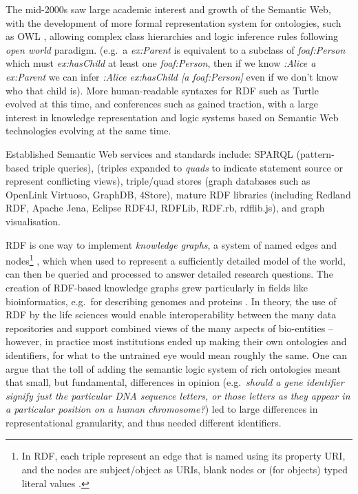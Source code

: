 The mid-2000s saw large academic interest and growth of the Semantic Web, with the development of more formal representation system for ontologies, such as OWL \cite{W3C 2012}, allowing complex class hierarchies and logic inference rules following \emph{open world} paradigm. (e.g.~a \emph{ex:Parent} is equivalent to a subclass of \emph{foaf:Person} which must \emph{ex:hasChild} at least one \emph{foaf:Person}, then if we know \emph{:Alice a ex:Parent} we can infer \emph{:Alice ex:hasChild {[}a foaf:Person{]}} even if we don't know who that child is). More human-readable syntaxes for RDF such as Turtle evolved at this time, and conferences such as  \cite{Horrocks 2022} gained traction, with a large interest in knowledge representation and logic systems based on Semantic Web technologies evolving at the same time.

Established Semantic Web services and standards include: SPARQL \cite{W3C 2013} (pattern-based triple queries),  \cite{Wood 2014} (triples expanded to \emph{quads} to indicate statement source or represent conflicting views), triple/quad stores (graph databases such as OpenLink Virtuoso, GraphDB, 4Store), mature RDF libraries (including Redland RDF, Apache Jena, Eclipse RDF4J, RDFLib, RDF.rb, rdflib.js), and graph visualisation.

RDF is one way to implement \emph{knowledge graphs}, a system of named edges and nodes\footnote{In RDF, each triple represent an edge that is named using its property URI, and the nodes are subject/object as URIs, blank nodes or (for objects) typed literal values \cite{Schreiber 2014}.} \cite{Nurdiati 2008}, which when used to represent a sufficiently detailed model of the world, can then be queried and processed to answer detailed research questions. The creation of RDF-based knowledge graphs grew particularly in fields like bioinformatics, e.g.~for describing genomes and proteins \cite{Goble 2008,Williams 2012}. In theory, the use of RDF by the life sciences would enable interoperability between the many data repositories and support combined views of the many aspects of bio-entities -- however, in practice most institutions ended up making their own ontologies and identifiers, for what to the untrained eye would mean roughly the same. One can argue that the toll of adding the semantic logic system of rich ontologies meant that small, but fundamental, differences in opinion (e.g.~\emph{should a gene identifier signify just the particular DNA sequence letters, or those letters as they appear in a particular position on a human chromosome?}) led to large differences in representational granularity, and thus needed different identifiers.

